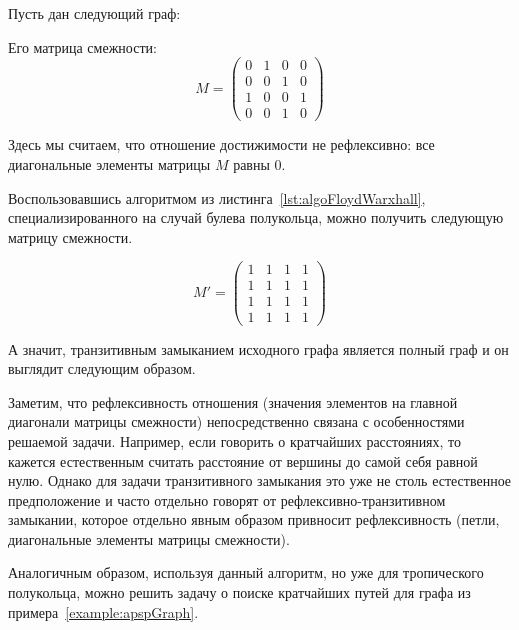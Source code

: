 \begin{example}\label{exmpl:transitiveClosure}
  Пусть дан следующий граф:
  \begin{center}
    
  \end{center}

  Его матрица смежности:
  $$ M = 
  \begin{pmatrix}
    0 & 1 & 0 & 0 \\
    0 & 0 & 1 & 0 \\
    1 & 0 & 0 & 1 \\
    0 & 0 & 1 & 0
  \end{pmatrix}
  $$

  Здесь мы считаем, что отношение достижимости не рефлексивно: все диагональные элементы матрицы $M$ равны 0. 

  Воспользовавшись алгоритмом из листинга~\ref{lst:algoFloydWarxhall}, специализированного на случай булева полукольца, можно получить следующую матрицу смежности.

  $$ M' = 
  \begin{pmatrix}
    1 & 1 & 1 & 1 \\
    1 & 1 & 1 & 1 \\
    1 & 1 & 1 & 1 \\
    1 & 1 & 1 & 1
  \end{pmatrix}
  $$

  А значит, транзитивным замыканием исходного графа является полный граф и он выглядит следующим образом.
  
  \begin{center}
    
  \end{center}

\end{example}

Заметим, что рефлексивность отношения (значения элементов на главной диагонали матрицы смежности) непосредственно связана с особенностями решаемой задачи. Например, если говорить о кратчайших расстояниях, то кажется естественным считать расстояние от вершины до самой себя равной нулю. Однако для задачи транзитивного замыкания это уже не столь естественное предположение и часто отдельно говорят от рефлексивно-транзитивном замыкании, которое отдельно явным образом привносит рефлексивность (петли, диагональные элементы матрицы смежности).

Аналогичным образом, используя данный алгоритм, но уже для тропического полукольца, можно решить задачу о поиске кратчайших путей для графа из примера~\ref{example:apspGraph}.

